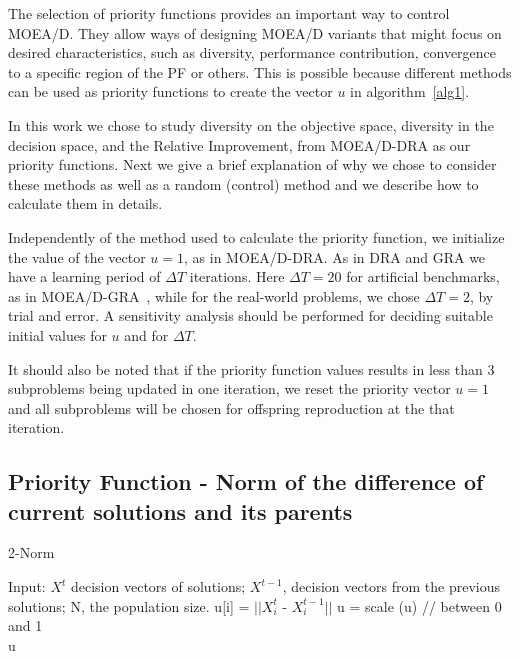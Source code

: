
The selection of priority functions provides an important way to control MOEA/D. They allow ways of designing MOEA/D variants that might focus on desired characteristics, such as diversity, performance contribution, convergence to a specific region of the PF or others. This is possible because different methods can be used as priority functions to create the vector $u$ in algorithm~\ref{alg1}. 

In this work we chose to study diversity on the objective space, diversity in the decision space, and the Relative Improvement, from MOEA/D-DRA as our priority functions. Next we give a brief explanation of why we chose to consider these methods as well as a random (control) method and we describe how to calculate them in details.

Independently of the method used to calculate the priority function, we initialize the value of the vector $u=1$, as in MOEA/D-DRA. As in DRA and GRA we have a learning period of $\Delta T$ iterations. Here $\Delta T=20$ for artificial benchmarks, as in MOEA/D-GRA~\cite{zhou2016all}, while for the real-world problems, we chose $\Delta T=2$, by trial and error. A sensitivity analysis should be performed for deciding suitable initial values for $u$ and for $\Delta T$.

 It should also be noted that if the priority function values results in less than 3 subproblems being updated in one iteration, we reset the priority vector $u = 1$  and all subproblems will be chosen for offspring reproduction at the that iteration.

\subsection{Priority Function - Norm of the difference of current solutions and its parents} 

\begin{algorithm}[t]
	\caption{2-Norm}\label{alg3}
	\begin{algorithmic}[1]
		
		\State Input: $X^{t}$ decision vectors of solutions; $X^{t-1}$, decision vectors from the previous solutions; N, the population size.
			\State u[i] = $||X^{t}_i$ - $X^{t-1}_i||$
		\EndFor
		\State u = scale (u) // between 0 and 1\\
	\Return u
	\end{algorithmic}
\end{algorithm}

